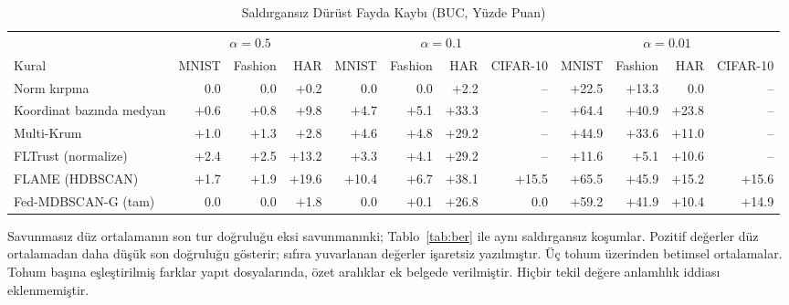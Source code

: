 \begin{table}[!tp]
\centering\footnotesize
\setlength{\tabcolsep}{4pt}
\caption{Saldırgansız Dürüst Fayda Kaybı (BUC, Yüzde Puan)}\label{tab:buc}
\begin{adjustbox}{max width=\textwidth}
\begin{tabular}{lrrrrrrrrrrr}
\toprule
& \multicolumn{3}{c}{$\alpha=0.5$} & \multicolumn{4}{c}{$\alpha=0.1$} & \multicolumn{4}{c}{$\alpha=0.01$} \\
\cmidrule(lr){2-4}\cmidrule(lr){5-8}\cmidrule(lr){9-12}
Kural & MNIST & Fashion & HAR & MNIST & Fashion & HAR & CIFAR-10 & MNIST & Fashion & HAR & CIFAR-10 \\
\midrule
Norm kırpma & 0.0 & 0.0 & $+$0.2 & 0.0 & 0.0 & $+$2.2 & -- & $+$22.5 & $+$13.3 & 0.0 & -- \\
Koordinat bazında medyan & $+$0.6 & $+$0.8 & $+$9.8 & $+$4.7 & $+$5.1 & $+$33.3 & -- & $+$64.4 & $+$40.9 & $+$23.8 & -- \\
Multi-Krum & $+$1.0 & $+$1.3 & $+$2.8 & $+$4.6 & $+$4.8 & $+$29.2 & -- & $+$44.9 & $+$33.6 & $+$11.0 & -- \\
FLTrust (normalize) & $+$2.4 & $+$2.5 & $+$13.2 & $+$3.3 & $+$4.1 & $+$29.2 & -- & $+$11.6 & $+$5.1 & $+$10.6 & -- \\
FLAME (HDBSCAN) & $+$1.7 & $+$1.9 & $+$19.6 & $+$10.4 & $+$6.7 & $+$38.1 & $+$15.5 & $+$65.5 & $+$45.9 & $+$15.2 & $+$15.6 \\
Fed-MDBSCAN-G (tam) & 0.0 & 0.0 & $+$1.8 & 0.0 & $+$0.1 & $+$26.8 & 0.0 & $+$59.2 & $+$41.9 & $+$10.4 & $+$14.9 \\
\bottomrule
\end{tabular}
\end{adjustbox}

\par\vspace{3pt}\parbox{\linewidth}{\footnotesize Savunmasız düz ortalamanın son tur doğruluğu eksi savunmanınki; Tablo~\ref{tab:ber} ile aynı saldırgansız koşumlar. Pozitif değerler düz ortalamadan daha düşük son doğruluğu gösterir; sıfıra yuvarlanan değerler işaretsiz yazılmıştır. Üç tohum üzerinden betimsel ortalamalar. Tohum başına eşleştirilmiş farklar yapıt dosyalarında, özet aralıklar ek belgede verilmiştir. Hiçbir tekil değere anlamlılık iddiası eklenmemiştir.}
\end{table}
